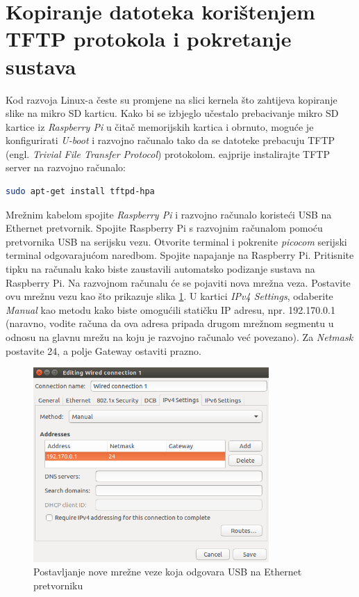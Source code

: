 \documentclass[11pt]{article}
\begin{document}
\section{Kopiranje datoteka korištenjem TFTP protokola i pokretanje sustava}
Kod razvoja Linux-a česte su promjene na slici kernela što zahtijeva kopiranje
 slike na mikro SD karticu. Kako bi se izbjeglo učestalo prebacivanje mikro SD
 kartice iz \textit{Raspberry Pi} u čitač memorijskih kartica i obrnuto, moguće
 je konfigurirati \textit{U-boot} i razvojno računalo tako da se datoteke
 prebacuju TFTP (engl. \textit{Trivial File Transfer Protocol}) protokolom.
 eajprije instalirajte TFTP server na razvojno računalo:
\begin{lstlisting}[language=bash]
sudo apt-get install tftpd-hpa
\end{lstlisting}
Mrežnim kabelom spojite \textit{Raspberry Pi} i razvojno računalo koristeći
 USB na Ethernet pretvornik. Spojite Raspberry Pi s razvojnim računalom pomoću
 pretvornika USB na serijsku vezu. Otvorite terminal i pokrenite
 \textit{picocom} serijski terminal odgovarajućom naredbom.
 Spojite napajanje na Raspberry Pi. Pritisnite tipku na računalu kako biste
 zaustavili automatsko podizanje sustava na Raspberry Pi. Na razvojnom računalu
 će se pojaviti nova mrežna veza. Postavite ovu mrežnu vezu kao što prikazuje
 slika \ref{fig:ubuntu-ethernet}. U kartici \textit{IPv4 Settings}, odaberite
 \textit{Manual} kao metodu kako biste omogućili statičku IP adresu, npr.
 192.170.0.1 (naravno, vodite računa da ova adresa pripada drugom mrežnom
 segmentu u odnosu na glavnu mrežu na koju je razvojno računalo već povezano).
 Za \textit{Netmask} postavite 24, a polje Gateway ostaviti prazno.
\begin{figure}[h!]
\centering
\includegraphics[width=0.8\textwidth]{ubuntu-ethernet.png}
\captionsetup{justification=centering}
\caption{Postavljanje nove mrežne veze koja odgovara USB na Ethernet
 pretvorniku}
\label{fig:ubuntu-ethernet}
\end{figure}
\end{document}
